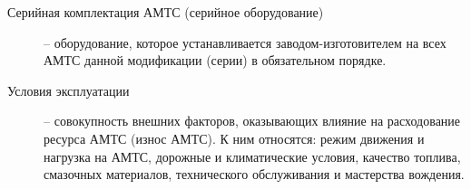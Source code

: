 \begin{description}
	\item
	[Серийная комплектация  АМТС (серийное оборудование)] -- оборудование, которое устанавливается заводом-изготовителем на всех АМТС данной модификации (серии) в обязательном порядке. 
	
	\item
	[Условия эксплуатации] -- совокупность внешних факторов, оказывающих влияние на расходование ресурса АМТС (износ АМТС). К ним относятся: режим движения и нагрузка на АМТС, дорожные и климатические условия, качество топлива, смазочных материалов, технического обслуживания и мастерства вождения. 
	


\end{description}
